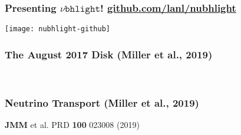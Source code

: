 \documentclass[]{beamer}
\begin{document}
\begin{frame}
  \frametitle{Presenting $\nu\texttt{bhlight}$! \url{github.com/lanl/nubhlight}}
  \begin{center}
    \texttt{[image: nubhlight-github]}
  \end{center}
\end{frame}

\begin{frame}
  \frametitle{The August 2017 Disk (Miller et al., 2019)}
  \begin{center}
     \\
  \end{center}
\end{frame}

\begin{frame}
  \frametitle{Neutrino Transport (Miller et al., 2019)}
  \begin{center}
  \end{center}
  \begin{tiny}
    \textbf{JMM} et al. PRD \textbf{100} 023008 (2019)
  \end{tiny}
\end{frame}
\end{document}
